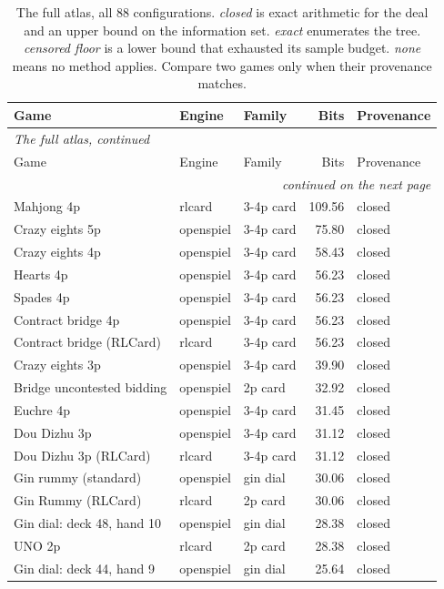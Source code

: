 \begin{longtable}{l l l r l}
\caption{The full atlas, all 88 configurations. \emph{closed} is exact arithmetic for the deal and an upper bound on the information set. \emph{exact} enumerates the tree. \emph{censored floor} is a lower bound that exhausted its sample budget. \emph{none} means no method applies. Compare two games only when their provenance matches.}\label{tab:app-atlas}\\
\toprule
Game & Engine & Family & Bits & Provenance \\
\midrule
\endfirsthead
\multicolumn{5}{l}{\emph{The full atlas, continued}}\\
\toprule
Game & Engine & Family & Bits & Provenance \\
\midrule
\endhead
\midrule
\multicolumn{5}{r}{\emph{continued on the next page}}\\
\endfoot
\bottomrule
\endlastfoot
Mahjong 4p & rlcard & 3-4p card & 109.56 & closed \\
Crazy eights 5p & openspiel & 3-4p card & 75.80 & closed \\
Crazy eights 4p & openspiel & 3-4p card & 58.43 & closed \\
Hearts 4p & openspiel & 3-4p card & 56.23 & closed \\
Spades 4p & openspiel & 3-4p card & 56.23 & closed \\
Contract bridge 4p & openspiel & 3-4p card & 56.23 & closed \\
Contract bridge (RLCard) & rlcard & 3-4p card & 56.23 & closed \\
Crazy eights 3p & openspiel & 3-4p card & 39.90 & closed \\
Bridge uncontested bidding & openspiel & 2p card & 32.92 & closed \\
Euchre 4p & openspiel & 3-4p card & 31.45 & closed \\
Dou Dizhu 3p & openspiel & 3-4p card & 31.12 & closed \\
Dou Dizhu 3p (RLCard) & rlcard & 3-4p card & 31.12 & closed \\
Gin rummy (standard) & openspiel & gin dial & 30.06 & closed \\
Gin Rummy (RLCard) & rlcard & 2p card & 30.06 & closed \\
Gin dial: deck 48, hand 10 & openspiel & gin dial & 28.38 & closed \\
UNO 2p & rlcard & 2p card & 28.38 & closed \\
Gin dial: deck 44, hand 9 & openspiel & gin dial & 25.64 & closed \\

\end{longtable}
